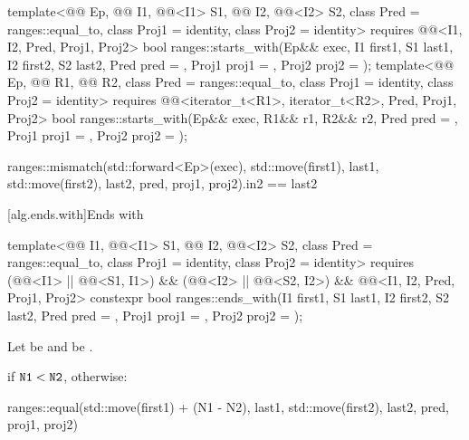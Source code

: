 \begin{itemdecl}
template<@@ Ep, @@ I1, @@<I1> S1,
         @@ I2, @@<I2> S2,
         class Pred = ranges::equal_to, class Proj1 = identity, class Proj2 = identity>
  requires @@<I1, I2, Pred, Proj1, Proj2>
  bool ranges::starts_with(Ep&& exec, I1 first1, S1 last1, I2 first2, S2 last2,
                           Pred pred = {}, Proj1 proj1 = {}, Proj2 proj2 = {});
template<@@ Ep, @@ R1,
         @@ R2, class Pred = ranges::equal_to,
         class Proj1 = identity, class Proj2 = identity>
  requires @@<iterator_t<R1>, iterator_t<R2>, Pred, Proj1, Proj2>
  bool ranges::starts_with(Ep&& exec, R1&& r1, R2&& r2,
                           Pred pred = {}, Proj1 proj1 = {}, Proj2 proj2 = {});
\end{itemdecl}

\begin{itemdescr}
\pnum
\returns
\begin{codeblock}
ranges::mismatch(std::forward<Ep>(exec), std::move(first1), last1, std::move(first2),
                 last2, pred, proj1, proj2).in2 == last2
\end{codeblock}
\end{itemdescr}

[alg.ends.with]{Ends with}

%
\begin{itemdecl}
template<@@ I1, @@<I1> S1, @@ I2, @@<I2> S2,
         class Pred = ranges::equal_to, class Proj1 = identity, class Proj2 = identity>
  requires (@@<I1> || @@<S1, I1>) &&
           (@@<I2> || @@<S2, I2>) &&
           @@<I1, I2, Pred, Proj1, Proj2>
  constexpr bool ranges::ends_with(I1 first1, S1 last1, I2 first2, S2 last2, Pred pred = {},
                                   Proj1 proj1 = {}, Proj2 proj2 = {});
\end{itemdecl}

\begin{itemdescr}
\pnum
Let  be  and
 be .

\pnum
\returns
{} if $\tcode{N1} < \tcode{N2}$, otherwise:
\begin{codeblock}
ranges::equal(std::move(first1) + (N1 - N2), last1, std::move(first2), last2,
              pred, proj1, proj2)
\end{codeblock}
\end{itemdescr}


